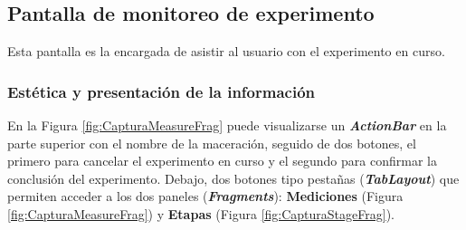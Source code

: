             
            
            
            
        
        \subsection{Pantalla de monitoreo de experimento}
        \label{DescripPantallaMonitoreoExperimento}
        \par Esta pantalla es la encargada de asistir al usuario con el experimento en curso.
        
            \subsubsection{Estética y presentación de la información}
            En la Figura \ref{fig:CapturaMeasureFrag} puede visualizarse un \textbf{\textit{\gls{ActionBar}}} en la parte superior con el nombre de la maceración, seguido de dos botones, el primero para cancelar el experimento en curso y el segundo para confirmar la conclusión del experimento. Debajo, dos botones tipo pestañas (\textbf{\textit{\gls{TabLayout}}}) que permiten acceder a los dos paneles (\textbf{\textit{Fragments}}): \textbf{Mediciones} (Figura \ref{fig:CapturaMeasureFrag}) y \textbf{Etapas} (Figura \ref{fig:CapturaStageFrag}).
            
